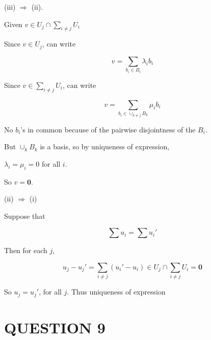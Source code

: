 \documentclass[a4paper]{article}
\begin{document}
(iii) $ \Rightarrow $ (ii). 

Given $ v \in U_{j} \cap \sum_{i\neq j} U_{i} $

Since $ v \in U_{j} $, can write

\[ v = \sum_{b_{i} \in B_{i}} \lambda_{i} b_{i} \]

Since $ v \in \sum_{i\neq j} U_{i} $, can write

\[ v = \sum_{b_{i} \in \cup_{k \neq j}B_{k}} \mu_{i} b_{i} \]

No $ b_{i} $'s in common because of the pairwise disjointness of the $ B_{i} $.

But $ \cup_{k} B_{k} $ is a basis, so by uniqueness of expression, 

$ \lambda_{i} = \mu_{i} = 0 $ for all $ i $.

So $ v = \mathbf{0} $.

(ii) $ \Rightarrow $ (i)

Suppose  that

\[ \sum u_{i} = \sum u_{i}' \]

Then for each $ j $,

\[ u_{j} - u_{j}'  = \sum_{i \neq j} (u_{i}' - u_{i} )  \in U_{j} \cap \sum_{i \neq j} U_{i} = \mathbf{0}  \]

So $ u_{j} = u_{j}' $, for all $ j $. Thus uniqueness of expression


\section{QUESTION 9}



	
	
	
	
	
	
\end{document}
